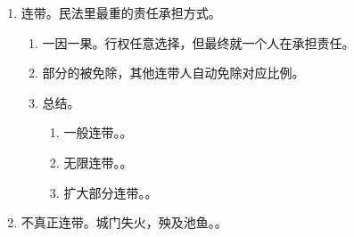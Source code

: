 \begin{enumerate}
\begin{enumerate}
\begin{enumerate}
                  \item {}。
                  \item {}。
                \end{enumerate}
          \item 连带。民法里最重的责任承担方式。
                \begin{enumerate}
                  \item 一因一果。行权任意选择，但最终就一个人在承担责任。
                  \item 部分的被免除，其他连带人自动免除对应比例。
                  \item 总结。
                        \begin{enumerate}
                          \item 一般连带。。
                          \item 无限连带。。
                          \item 扩大部分连带。。
                        \end{enumerate}
                \end{enumerate}
          \item 不真正连带。城门失火，殃及池鱼。。
        \end{enumerate}
\end{enumerate}
